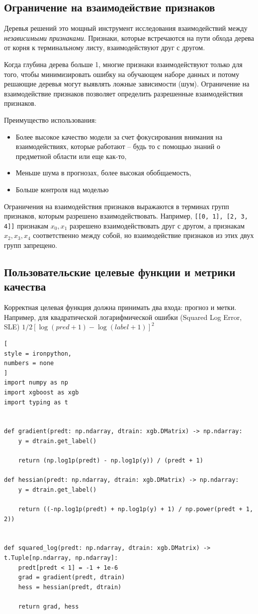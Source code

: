 \documentclass[%
	11pt,
	a4paper,
	utf8,
		]{article}
\begin{document}
\subsection{Ограничение на взаимодействие признаков}

Деревья решений это мощный инструмент исследования взаимодействий между \emph{независимыми признаками}. Признаки, которые встречаются на пути обхода дерева от корня к терминальному листу, взаимодействуют друг с другом.

Когда глубина дерева больше 1, многие признаки взаимодействуют только для того, чтобы минимизировать ошибку на обучающем наборе данных и потому решающие деревья могут выявлять ложные зависимости (шум). Ограничение на взаимодействие признаков позволяет определить разрешенные взаимодействия признаков.

Преимущество использования:
\begin{itemize}
	\item Более высокое качество модели за счет фокусирования внимания на взаимодействиях, которые работают -- будь то с помощью знаний о предметной области или еще как-то,
	
	\item Меньше шума в прогнозах, более высокая обобщаемость,
	
	\item Больше контроля над моделью
\end{itemize}

Ограничения на взаимодействия признаков выражаются в терминах групп признаков, которым разрешено взаимодействовать. Например, \verb|[[0, 1], [2, 3, 4]]| признакам $ x_0, x_1 $ разрешено взаимодействовать друг с другом, а признакам $ x_2, x_3, x_4 $ соответственно между собой, но взаимодействие признаков из этих двух групп запрещено.


\subsection{Пользовательские целевые функции и метрики качества}

Корректная целевая функция должна принимать два входа: прогноз и метки. Например, для квадратической логарифмической ошибки (Squared Log Error, SLE) $ 1 / 2 [\log (pred + 1) - \log(label +1)]^2 $
\begin{lstlisting}[
style = ironpython,
numbers = none
]
import numpy as np
import xgboost as xgb
import typing as t


def gradient(predt: np.ndarray, dtrain: xgb.DMatrix) -> np.ndarray:
	y = dtrain.get_label()

	return (np.log1p(predt) - np.log1p(y)) / (predt + 1)

def hessian(predt: np.ndarray, dtrain: xgb.DMatrix) -> np.ndarray:
	y = dtrain.get_label()

	return ((-np.log1p(predt) + np.log1p(y) + 1) / np.power(predt + 1, 2))


def squared_log(predt: np.ndarray, dtrain: xgb.DMatrix) -> t.Tuple[np.ndarray, np.ndarray]:
	predt[predt < 1] = -1 + 1e-6
	grad = gradient(predt, dtrain)
	hess = hessian(predt, dtrain)
	
	return grad, hess
\end{lstlisting}
\end{document}
